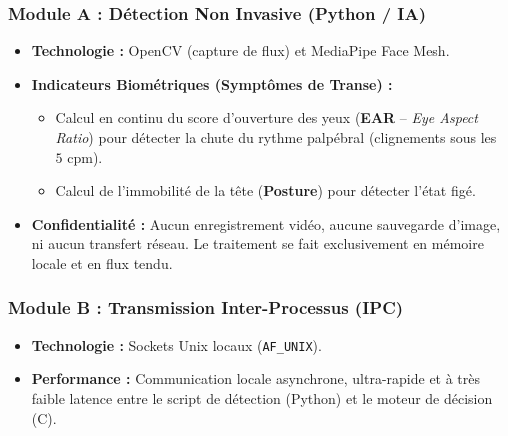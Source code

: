 \documentclass[a4paper, 12pt, twoside]{article}
\begin{document}
\subsubsection{Module A : Détection Non Invasive (Python / IA)}
\begin{itemize}
    \item \textbf{Technologie :} OpenCV (capture de flux) et MediaPipe Face Mesh.
    \item \textbf{Indicateurs Biométriques (Symptômes de Transe) :}
    \begin{itemize}
        \item Calcul en continu du score d'ouverture des yeux (\textbf{EAR} -- \textit{Eye Aspect Ratio}) pour détecter la chute du rythme palpébral (clignements sous les $5\text{ cpm}$).
        \item Calcul de l'immobilité de la tête (\textbf{Posture}) pour détecter l'état figé.
    \end{itemize}
    \item \textbf{Confidentialité :} Aucun enregistrement vidéo, aucune sauvegarde d'image, ni aucun transfert réseau. Le traitement se fait exclusivement en mémoire locale et en flux tendu.
\end{itemize}

\subsubsection{Module B : Transmission Inter-Processus (IPC)}
\begin{itemize}
    \item \textbf{Technologie :} Sockets Unix locaux (\texttt{AF\_UNIX}).
    \item \textbf{Performance :} Communication locale asynchrone, ultra-rapide et à très faible latence entre le script de détection (Python) et le moteur de décision (C).
\end{itemize}
\end{document}

